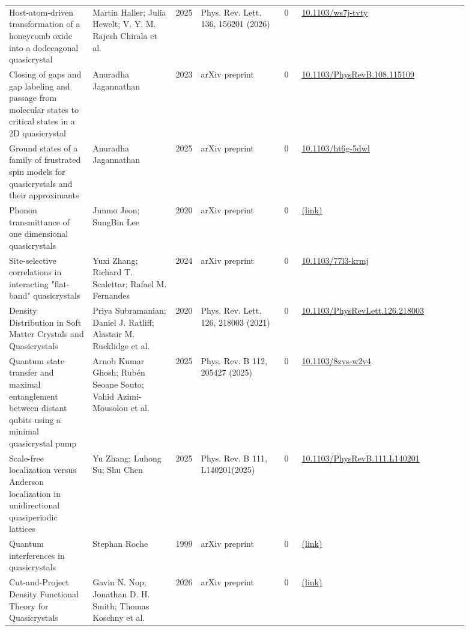 \documentclass[10pt,a4paper]{article}
\begin{document}
{\begin{longtable}{p{0.192\linewidth}p{0.192\linewidth}p{0.043\linewidth}p{0.192\linewidth}p{0.043\linewidth}p{0.132\linewidth}p{0.096\linewidth}}
Host-atom-driven transformation of a honeycomb oxide into a dodecagonal quasicrystal & Martin Haller; Julia Hewelt; V. Y. M. Rajesh Chirala et al. & 2025 & Phys. Rev. Lett. 136, 156201 (2026) & 0 & \href{https://doi.org/10.1103/ws7j-tvty}{10.1103/ws7j-tvty} &  \\
Closing of gaps and gap labeling and passage from molecular states to critical states in a 2D quasicrystal & Anuradha Jagannathan & 2023 & arXiv preprint & 0 & \href{https://doi.org/10.1103/PhysRevB.108.115109}{10.1103/PhysRevB.108.115109} &  \\
Ground states of a family of frustrated spin models for quasicrystals and their approximants & Anuradha Jagannathan & 2025 & arXiv preprint & 0 & \href{https://doi.org/10.1103/ht6g-5dwl}{10.1103/ht6g-5dwl} &  \\
Phonon transmittance of one dimensional quasicrystals & Junmo Jeon; SungBin Lee & 2020 & arXiv preprint & 0 & \href{http://arxiv.org/abs/2009.12378v1}{(link)} &  \\
Site-selective correlations in interacting "flat-band" quasicrystals & Yuxi Zhang; Richard T. Scalettar; Rafael M. Fernandes & 2024 & arXiv preprint & 0 & \href{https://doi.org/10.1103/77l3-krmj}{10.1103/77l3-krmj} &  \\
Density Distribution in Soft Matter Crystals and Quasicrystals & Priya Subramanian; Daniel J. Ratliff; Alastair M. Rucklidge et al. & 2020 & Phys. Rev. Lett. 126, 218003 (2021) & 0 & \href{https://doi.org/10.1103/PhysRevLett.126.218003}{10.1103/PhysRevLett.126.218003} &  \\
Quantum state transfer and maximal entanglement between distant qubits using a minimal quasicrystal pump & Arnob Kumar Ghosh; Rubén Seoane Souto; Vahid Azimi-Mousolou et al. & 2025 & Phys. Rev. B 112, 205427 (2025) & 0 & \href{https://doi.org/10.1103/8zys-w2v4}{10.1103/8zys-w2v4} &  \\
Scale-free localization versus Anderson localization in unidirectional quasiperiodic lattices & Yu Zhang; Luhong Su; Shu Chen & 2025 & Phys. Rev. B 111, L140201(2025) & 0 & \href{https://doi.org/10.1103/PhysRevB.111.L140201}{10.1103/PhysRevB.111.L140201} &  \\
Quantum interferences in quasicrystals & Stephan Roche & 1999 & arXiv preprint & 0 & \href{http://arxiv.org/abs/cond-mat/9907476v2}{(link)} &  \\
Cut-and-Project Density Functional Theory for Quasicrystals & Gavin N. Nop; Jonathan D. H. Smith; Thomas Koschny et al. & 2026 & arXiv preprint & 0 & \href{http://arxiv.org/abs/2603.14590v1}{(link)} &  \\

\end{longtable}}
\end{document}
